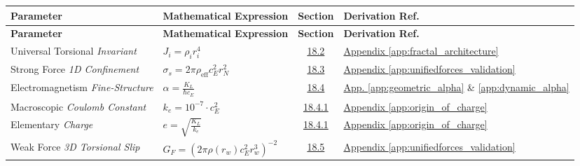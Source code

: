 \vspace{0.5cm}
\noindent
\renewcommand{\arraystretch}{1.6}
\begin{longtable}{@{} p{4.5cm} p{6cm} c p{4cm} @{}}
\toprule
\textbf{Parameter} & \textbf{Mathematical Expression} & \textbf{Section} & \textbf{Derivation Ref.} \\
\midrule
\endfirsthead

\toprule
\textbf{Parameter} & \textbf{Mathematical Expression} & \textbf{Section} & \textbf{Derivation Ref.} \\
\midrule
\endhead

Universal Torsional \newline \textit{Invariant} & $J_i = \rho_i r_i^4$ & \hyperref[sec:18.2]{18.2} & \hyperref[app:fractal_architecture]{Appendix \ref*{app:fractal_architecture}} \\

Strong Force \newline \textit{1D Confinement} & $\sigma_s = 2\pi \rho_{\text{eff}} c_E^2 r_N^2$ & \hyperref[sec:18.3]{18.3} & \hyperref[app:unifiedforces_validation]{Appendix \ref*{app:unifiedforces_validation}} \\

Electromagnetism \newline \textit{Fine-Structure} & $\alpha = \frac{K_L}{\hbar c_E}$ & \hyperref[sec:18.4]{18.4} & \hyperref[app:geometric_alpha]{App. \ref*{app:geometric_alpha}} \& \hyperref[app:dynamic_alpha]{\ref*{app:dynamic_alpha}} \\

Macroscopic \newline \textit{Coulomb Constant} & $k_e = 10^{-7} \cdot c_E^2$ & \hyperref[sec:18.4.1]{18.4.1} & \hyperref[app:origin_of_charge]{Appendix \ref*{app:origin_of_charge}} \\

Elementary \newline \textit{Charge} & $e = \sqrt{\frac{K_L}{k_e}}$ & \hyperref[sec:18.4.1]{18.4.1} & \hyperref[app:origin_of_charge]{Appendix \ref*{app:origin_of_charge}} \\

Weak Force \newline \textit{3D Torsional Slip} & $G_F = (2\pi \rho(r_w) c_E^2 r_w^3)^{-2}$ & \hyperref[sec:18.5]{18.5} & \hyperref[app:unifiedforces_validation]{Appendix \ref*{app:unifiedforces_validation}} \\


\end{longtable}
